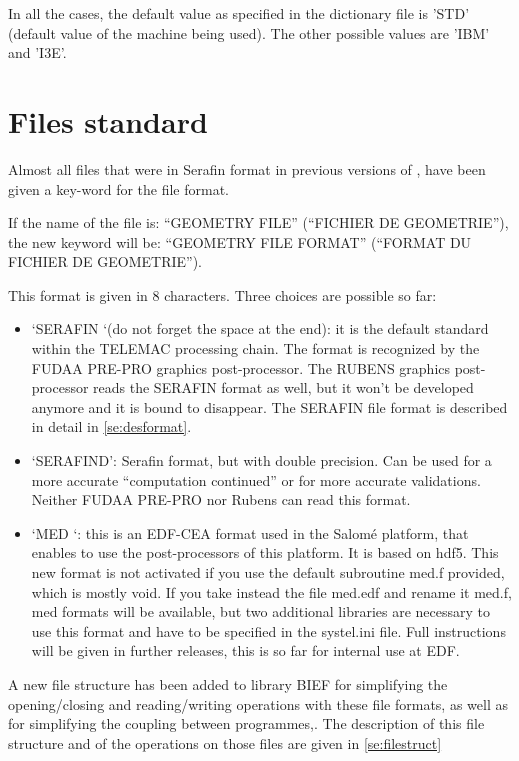  In all the cases, the default value as specified in the dictionary file is 'STD' (default value of the machine being used). The other possible values are 'IBM' and 'I3E'.


\section{ Files standard}

 Almost all files that were in Serafin format in previous versions of \tomawac, have been given a key-word for the file format.

 If the name of the file is: ``GEOMETRY FILE'' (``FICHIER DE GEOMETRIE''), the new keyword will be: ``GEOMETRY FILE FORMAT'' (``FORMAT DU FICHIER DE GEOMETRIE'').

 This format is given in 8 characters. Three choices are possible so far:

\begin{itemize}
\item  `SERAFIN `(do not forget the space at the end): it is the default standard within the TELEMAC processing chain. The format is recognized by the FUDAA PRE-PRO graphics post-processor. The RUBENS graphics post-processor reads the SERAFIN format as well, but it won't be developed anymore and it is bound to disappear. The SERAFIN file format is described in detail in \ref{se:desformat}.

\item  `SERAFIND': Serafin format, but with double precision. Can be used for a more accurate ``computation continued'' or for more accurate validations. Neither FUDAA PRE-PRO nor Rubens can read this format.

\item  `MED  `: this is an EDF-CEA format used in the Salomé platform, that enables to use the post-processors of this platform. It is based on hdf5. This new format is not activated if you use the default subroutine med.f provided, which is mostly void. If you take instead the file med.edf and rename it med.f, med formats will be available, but two additional libraries are necessary to use this format and have to be specified in the systel.ini file. Full instructions will be given in further releases, this is so far for internal use at EDF.
\end{itemize}

 A new file structure has been added to library BIEF for simplifying the opening/closing and reading/writing operations with these file formats, as well as for simplifying the coupling between programmes,. The description of this file structure and of the operations on those files are given in \ref{se:filestruct}

